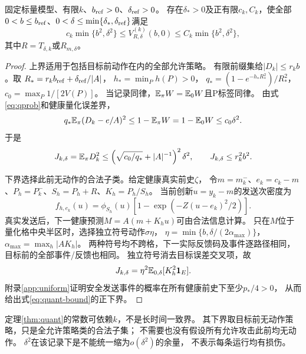 \begin{theorem}[标量有限精度的零TV损伤地板]
\label{thm:quant}
固定标量模型、有限$k$、$b_{\rm ref}>0$、$\delta_{\rm ref}>0$。
存在$\delta_*>0$及正有限$c_k,C_k$，使全部
$0<b\le b_{\rm ref}$、$0<\delta\le\min\{\delta_*,\delta_{\rm ref}\}$满足
\begin{equation}
c_k\min\{b^2,\delta^2\}\le V_{R,\delta}^{(k)}(b,0)
\le C_k\min\{b^2,\delta^2\},
\label{eq:quant-bound}
\end{equation}
其中$R=T_{\delta,k}$或$R_{m,\delta}$。
\end{theorem}
\begin{proof}
上界适用于包括目标前动作在内的全部允许策略。
有限前缀集给$|D_k|\le r_kb$。取
$R_*=r_kb_{\rm ref}+\delta_{\rm ref}/|A|$，
$h_*=\min_Ph(P)>0$，
$q_*=(1-e^{-h_*R_*^2})/R_*^2$，
$c_0=\max_P1/[2V(P)]$。
当记录同律，$\mathbb E_\pi W=\mathbb E_0W$且P标签同律。
由式\eqref{eq:qprob}和健康量化误差界，
\[
q_*\mathbb E_\pi(D_k-e/A)^2\le1-\mathbb E_\pi W
=1-\mathbb E_0W\le c_0\delta^2.
\]
于是
\[
J_{k,\delta}=\mathbb E_\pi D_k^2
\le\left(\sqrt{c_0/q_*}+|A|^{-1}\right)^2\delta^2,
\qquad J_{k,\delta}\le r_k^2b^2 .
\]

下界选择此前无动作的合法子类。给定健康真实前史$\zeta$，
令$m=m_k^-$、$e_k=c_k-m$、$P_h=P_k^-$、$S_h=P_h+R$、$K_h=P_h/S_h$。
当前创新$u=y_k-m$的发送次密度为
\begin{equation}
f_{h,e_k}(u)=\phi_{S_h}(u)[1-\exp(-Z(u-e_k)^2/2)].
\label{eq:sentq}
\end{equation}
真实发送后，下一健康预测$M=A(m+K_hu)$可由合法信息计算。
只在$M$位于量化格中央半区时，选择独立符号动作$\sigma\eta$，
$\eta=\min\{b,\delta/(2\alpha_{\max})\}$，
$\alpha_{\max}=\max_h|AK_h|$。
两种符号均不跨格，下一实际反馈码及事件逐路径相同，
目标前的全部事件/反馈也相同。
独立符号消去目标误差交叉项，故
\[
J_{k,\delta}=\eta^2\mathbb E_{0,\delta}[K_h^2\mathbf 1_E].
\]
附录\ref{app:uniform}证明安全发送事件的概率在所有健康前史下至少$p_*/4>0$，
从而给出式\eqref{eq:quant-bound}的正下界。
\end{proof}

定理\ref{thm:quant}的常数可依赖$k$，不是长时间一致界。
其下界取目标前无动作策略，只是全允许策略类的合法子集；
不需要也没有假设所有允许攻击此前均无动作。
$\delta^2$在该记录下是不能统一缩为$o(\delta^2)$的余量，
不表示每条运行均有损伤。

